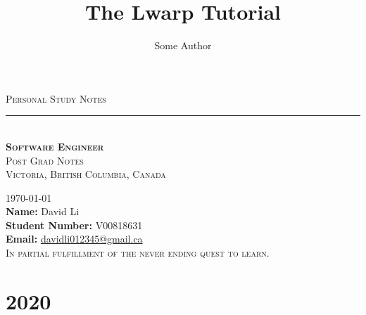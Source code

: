 \documentclass{book}
\title{The Lwarp Tutorial}
\author{Some Author}
\begin{document}
\begin{warpHTML}
	\maketitle                   %
\end{warpHTML}
\begin{center}
	{\Huge \textsc{Personal Study Notes} \\ \vspace{40pt}}
	\rule[13pt]{1\textwidth}{1pt} \\ \vspace{1pt}
	{\LARGE \textbf{{\textsc{Software Engineer}}} \\ }
	{\Large \textsc{Post Grad Notes} \\} 
	\vspace{4pt} 
	\vspace{20pt}
	{\Large \textsc{Victoria, British Columbia, Canada} \\ \vspace{45pt} }
	
	{\Large \textsc{\today} \\ \vspace{15pt}
		\textbf{Name:} \hfill David Li \\
		\textbf{Student Number:} \hfill V00818631 \\
		\textbf{Email:} \hfill \href{mailto:davidli012345@gmail.ca}{davidli012345@gmail.ca} \\
		\vspace{15pt}
		{\Large \textsc{In partial fulfillment of the never ending quest to learn. \\
			}
		}	
	}
\end{center}


\tableofcontents                %
\listoffigures
\lstlistoflistings %




\part{2020}
\end{document}
